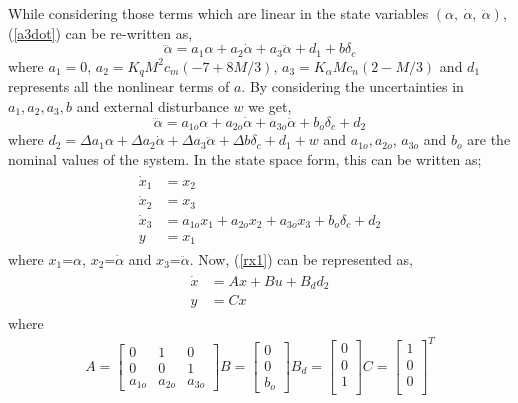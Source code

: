 \documentclass[conference]{IEEEtran}
\begin{document}
		 While considering those terms which are linear in the state variables $(\alpha,\ \dot{\alpha},\ \ddot{\alpha})$, (\ref{a3dot}) can be re-written as, 
		\begin{equation}
			\dddot{\alpha} = a_1 \alpha + a_2 \dot{\alpha} + a_3 \ddot{\alpha} + d_1 + b\delta_c \label{a3dot_ss}
		\end{equation}	
		where $a_1 = 0$, $a_2 = K_q M^2 c_m(-7 + 8M/3)$, $a_3 = K_\alpha M c_n(2 - M/3)$ and $d_1$ represents all the nonlinear terms of $a$. By considering the uncertainties in $a_1, a_2, a_3, b$ and external disturbance $w$ we get,
		\begin{equation}
				\dddot{\alpha} = a_{1o} \alpha + a_{2o} \dot{\alpha} + a_{3o} \ddot{\alpha} + b_o\delta_c + d_2
		\end{equation}
		where $d_2 = \Delta{a_1}\alpha + \Delta{a_2}\dot{\alpha} + \Delta{a_3}\ddot{\alpha} + \Delta{b\delta}_c + d_1 + w$ and $a_{1o}, a_{2o}$, $a_{3o}$ and $b_o$ are the nominal values of the system. In the state space form, this can be written as;
		\begin{eqnarray}
			\begin{aligned}
				\dot{x}_1 &= x_2 \\
				\dot{x}_2 &= x_3 \\
				\dot{x}_3 &= a_{1o}x_1 + a_{2o}x_2 + a_{3o}x_3 + b_o \delta_c + d_2 \\
				y &= x_1 \label{rx1}
			\end{aligned}
		\end{eqnarray}
		where $x_1$=$\alpha$, $x_2$=$\dot{\alpha}$ and $x_3$=$\ddot{\alpha}$.
		Now, (\ref{rx1}) can be represented as,
		\begin{eqnarray}
			\begin{aligned}
				\dot{x} &= Ax + Bu + B_d d_2 \\
				y &= Cx \nonumber
			\end{aligned}
		\end{eqnarray}
		where 
		\begin{eqnarray}
			A = 
			\begin{bmatrix}
				0 & 1 & 0\\
				0 & 0 & 1\\
				a_{1o} & a_{2o} & a_{3o}
			\end{bmatrix}
			B = 
			\begin{bmatrix}
				0 \\
				0 \\
				b_o
			\end{bmatrix}
			B_d = 
			\begin{bmatrix}
				0 \\
				0 \\
				1 \\
			\end{bmatrix} 
			C = 
			\begin{bmatrix}
				1 \\
				0 \\
				0 \\
			\end{bmatrix}^T \nonumber
		\end{eqnarray}
\end{document}
